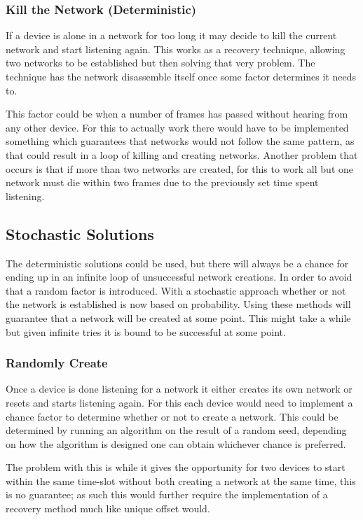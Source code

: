\subsubsection{Kill the Network (Deterministic)}\label{KtN}
If a device is alone in a network for too long it may decide to kill the current network and start listening again.
This works as a recovery technique, allowing two networks to be established but then solving that very problem.
The technique has the network disassemble itself once some factor determines it needs to.

This factor could be when a number of frames has passed without hearing from any other device.
For this to actually work there would have to be implemented something which guarantees that networks would not follow the same pattern, as that could result in a loop of killing and creating networks.
Another problem that occurs is that if more than two networks are created, for this to work all but one network must die within two frames due to the previously set time spent listening.

\subsection{Stochastic Solutions}
The deterministic solutions could be used, but there will always be a chance for ending up in an infinite loop of unsuccessful network creations.
In order to avoid that a random factor is introduced.
With a stochastic approach whether or not the network is established is now based on probability.
Using these methods will guarantee that a network will be created at some point.
This might take a while but given infinite tries it is bound to be successful at some point.


\subsubsection{Randomly Create}\label{RCreate}
Once a device is done listening for a network it either creates its own network or resets and starts listening again.
For this each device would need to implement a chance factor to determine whether or not to create a network.
This could be determined by running an algorithm on the result of a random seed, depending on how the algorithm is designed one can obtain whichever chance is preferred.

The problem with this is while it gives the opportunity for two devices to start within the same time-slot without both creating a network at the same time, this is no guarantee; as such this would further require the implementation of a recovery method much like unique offset would.


